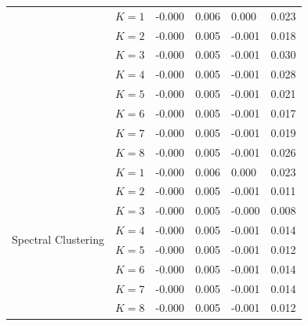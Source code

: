 \begin{table}[!t]
\begin{tabular}{l|c|ll|ll}
      & $K=1$ & -0.000 & 0.006 &  0.000 & 0.023 \\
      & $K=2$ & -0.000 & 0.005 & -0.001 & 0.018 \\
      & $K=3$ & -0.000 & 0.005 & -0.001 & 0.030 \\
      & $K=4$ & -0.000 & 0.005 & -0.001 & 0.028 \\
      & $K=5$ & -0.000 & 0.005 & -0.001 & 0.021 \\
      & $K=6$ & -0.000 & 0.005 & -0.001 & 0.017 \\
      & $K=7$ & -0.000 & 0.005 & -0.001 & 0.019 \\
      & $K=8$ & -0.000 & 0.005 & -0.001 & 0.026 \\
    \midrule
    \multirow[t]{8}{*}{Spectral Clustering} 
      & $K=1$ & -0.000 & 0.006 &  0.000 & 0.023 \\
      & $K=2$ & -0.000 & 0.005 & -0.001 & 0.011 \\
      & $K=3$ & -0.000 & 0.005 & -0.000 & 0.008 \\
      & $K=4$ & -0.000 & 0.005 & -0.001 & 0.014 \\
      & $K=5$ & -0.000 & 0.005 & -0.001 & 0.012 \\
      & $K=6$ & -0.000 & 0.005 & -0.001 & 0.014 \\
      & $K=7$ & -0.000 & 0.005 & -0.001 & 0.014 \\
      & $K=8$ & -0.000 & 0.005 & -0.001 & 0.012 \\
    \midrule
    \end{tabular}
\end{table}

